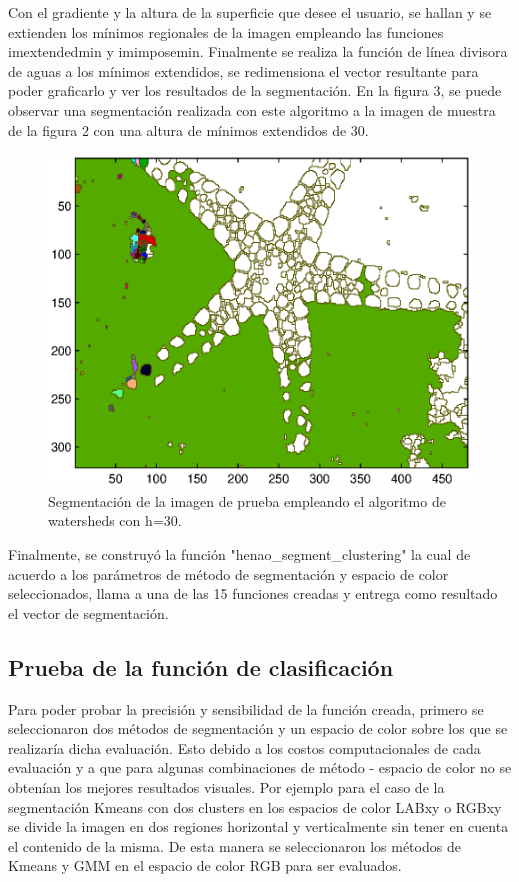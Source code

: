 \documentclass[10pt,twocolumn,letterpaper]{article}
\begin{document}
Con el gradiente y la altura de la superficie que desee el usuario, se hallan y se extienden los mínimos regionales de la imagen empleando las funciones imextendedmin y imimposemin. Finalmente se realiza la función de línea divisora de aguas a los mínimos extendidos, se redimensiona el vector resultante para poder graficarlo y ver los resultados de la segmentación. En la figura 3, se puede observar una segmentación realizada con este algoritmo a la imagen de muestra de la figura 2 con una altura de mínimos extendidos de 30.

\begin{figure}[t]
\begin{center}
\includegraphics[width=0.8\linewidth]{estrellaWS30.eps}
\end{center}
   \caption{Segmentación de la imagen de prueba empleando el algoritmo de watersheds con h=30.}
\label{fig:seg}
\end{figure}

Finalmente, se construyó la función "henao\_segment\_clustering" la cual de acuerdo a los parámetros de método de segmentación y espacio de color seleccionados, llama a una de las 15 funciones creadas y entrega como resultado el vector de segmentación.
\subsection{Prueba de la función de clasificación}

Para poder probar la precisión y sensibilidad de la función creada, primero se seleccionaron dos métodos de segmentación y un espacio de color sobre los que se realizaría dicha evaluación. Esto debido a los costos computacionales de cada evaluación y a que para algunas combinaciones de método - espacio de color no se obtenían los mejores resultados visuales. Por ejemplo para el caso de la segmentación Kmeans con dos clusters en los espacios de color LABxy o RGBxy se divide la imagen en dos regiones horizontal y verticalmente sin tener en cuenta el contenido de la misma. De esta manera se seleccionaron los métodos de Kmeans y GMM en el espacio de color RGB para ser evaluados.
\end{document}
